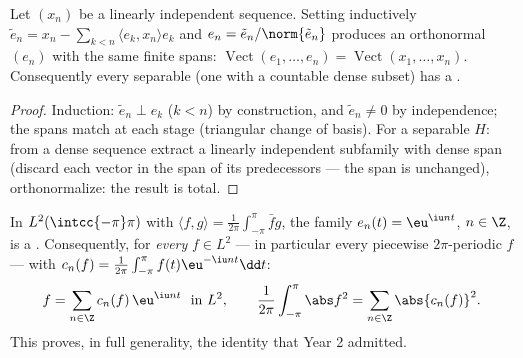 \begin{proposition}\label{prop:b3:hilbert:gramschmidt}
Let $(x_n)$ be a linearly independent sequence. Setting
inductively $\tilde e_n = x_n - \sum_{k<n}\langle e_k,
x_n\rangle e_k$ and $e_n = \tilde e_n/\norm{\tilde e_n}$
produces an orthonormal $(e_n)$ with the same finite spans:
$\operatorname{Vect}(e_1, \dots, e_n) = \operatorname{Vect}
(x_1, \dots, x_n)$. Consequently every separable 
(one with a countable dense subset) has a .
\end{proposition}

\begin{proof}
Induction: $\tilde e_n \perp e_k$ ($k < n$) by construction,
and $\tilde e_n \neq 0$ by independence; the spans match at
each stage (triangular change of basis). For a separable $H$:
from a dense sequence extract a linearly independent
subfamily with dense span (discard each vector in the span of
its predecessors — the span is unchanged), orthonormalize:
the result is total.
\end{proof}

\begin{theorem}
\label{thm:b3:hilbert:fourier}
In $L^2(\intcc{-\pi}\pi)$ with $\langle f, g\rangle =
\frac1{2\pi}\int_{-\pi}^\pi \bar fg$, the family $e_n(t) =
\eu^{\iu nt}$, $n \in \Z$, is a . Consequently,
for \emph{every} $f \in L^2$ --- in particular every piecewise
 $2\pi$-periodic $f$ --- with $c_n(f) =
\frac1{2\pi}\int_{-\pi}^{\pi}f(t)\eu^{-\iu nt}\dd t$:
\[
f = \sum_{n\in\Z}c_n(f)\,\eu^{\iu nt} \ \ \text{in } L^2,
\qquad
\frac1{2\pi}\int_{-\pi}^{\pi}\abs f^2 =
\sum_{n\in\Z}\abs{c_n(f)}^2 .
\]
This proves, in full generality, the  identity that
Year 2 admitted.
\end{theorem}

